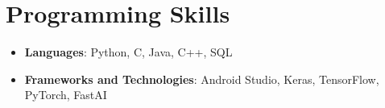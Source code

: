 \documentclass[letterpaper,11pt]{article}
\newcommand{\resumeSubHeadingListStart}{\begin{itemize}[leftmargin=*]}
\newcommand{\resumeSubHeadingListEnd}{\end{itemize}}
\begin{document}
\section{Programming Skills}
  \resumeSubHeadingListStart
   \item{
     \textbf{Languages}{: Python, C, Java, C++, SQL}
      }
      \item{
       \textbf{Frameworks and Technologies}{: Android Studio, Keras, TensorFlow, PyTorch, FastAI}
    }
  \resumeSubHeadingListEnd
\end{document}
